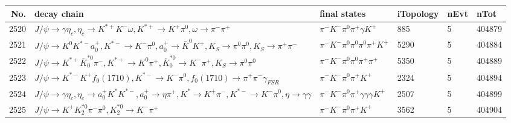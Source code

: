 \begin{table}[htbp] 
\begin{center}
\begin{small}
\begin{tabular}{rlllll}\hline\hline
 No. & decay chain & final states &  iTopology & nEvt & nTot \\\hline
2520&$J/\psi       \rightarrow \gamma       \eta_{c}    , \eta_{c}     \rightarrow K^{*+}         K^{-}          \omega         , K^{*+}          \rightarrow K^{+}          \pi^{0}        , \omega          \rightarrow \pi^{-}        \pi^{+}        $&$\pi^{-}        K^{-}          \pi^{0}        \pi^{+}        \gamma       K^{+}          $&  885&    5&404879\\
2521&$J/\psi       \rightarrow K^{0}          K^{*-}         a_{0}^{+}      , K^{*-}          \rightarrow K^{-}          \pi^{0}        , a_{0}^{+}       \rightarrow \bar{K}^{0}   K^{+}          , K_{S}           \rightarrow \pi^{0}        \pi^{0}        , K_{S}           \rightarrow \pi^{+}        \pi^{-}        $&$\pi^{-}        K^{-}          \pi^{0}        \pi^{0}        \pi^{0}        \pi^{+}        K^{+}          $& 5290&    5&404884\\
2522&$J/\psi       \rightarrow K^{*+}         \bar{K}_0^{*0}\pi^{-}        , K^{*+}          \rightarrow K^{0}          \pi^{+}        , \bar{K}_0^{*0} \rightarrow K^{-}          \pi^{+}        , K_{S}           \rightarrow \pi^{0}        \pi^{0}        $&$\pi^{-}        K^{-}          \pi^{0}        \pi^{0}        \pi^{+}        \pi^{+}        $& 5350&    5&404889\\
2523&$J/\psi       \rightarrow K^{*-}         K^{+}          f_{0}(1710)    , K^{*-}          \rightarrow K^{-}          \pi^{0}        , f_{0}(1710)     \rightarrow \pi^{+}        \pi^{-}        \gamma_{FSR} $&$\pi^{-}        K^{-}          \pi^{0}        \pi^{+}        K^{+}          $& 2324&    5&404894\\
2524&$J/\psi       \rightarrow \gamma       \eta_{c}    , \eta_{c}     \rightarrow a_{0}^{+}      K^{*}          K^{*-}         , a_{0}^{+}       \rightarrow \eta          \pi^{+}        , K^{*}           \rightarrow K^{+}          \pi^{-}        , K^{*-}          \rightarrow K^{-}          \pi^{0}        , \eta           \rightarrow \gamma       \gamma       $&$\pi^{-}        K^{-}          \pi^{0}        \pi^{+}        \gamma       \gamma       \gamma       K^{+}          $& 2507&    5&404899\\
2525&$J/\psi       \rightarrow K^{+}          K_2^{*0}       \pi^{-}        \pi^{0}        , K_2^{*0}        \rightarrow K^{-}          \pi^{+}        $&$\pi^{-}        K^{-}          \pi^{0}        \pi^{+}        K^{+}          $& 3562&    5&404904\\

\end{tabular}
\end{small}
\end{center}
\end{table}
